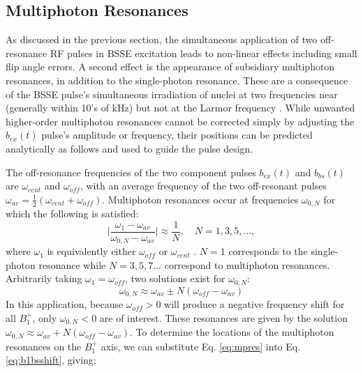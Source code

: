 \documentclass[a4paper,12pt]{article}
\newcommand{\bext}{b_{ex}(t)}
\newcommand{\bbst}{b_{bs}(t)}
\begin{document}
\subsection*{Multiphoton Resonances}
As discussed in the previous section, the simultaneous application of two off-resonance RF pulses in BSSE excitation
leads to non-linear effects including small flip angle errors. 
A second effect is the appearance of subsidiary multiphoton resonances,
in addition to the single-photon resonance. These are a consequence of the BSSE pulse's simultaneous irradiation of nuclei at two frequencies near (generally within 10's of kHz) but not at the Larmor frequency \cite{Zur1983MultiphotonI=1/2}.
While unwanted higher-order multiphoton resonances cannot be corrected simply by adjusting the $\bext$ pulse's
amplitude or frequency, 
their positions can be predicted analytically as follows and used to guide the pulse design. \par The off-resonance frequencies of the two component pulses $\bext$ and $\bbst$ are $\omega_{cent}$ and $ \omega_{off}$, with an average frequency of the two off-resonant pulses $\omega_{av}= \frac{1}{2}(\omega_{cent} + \omega_{off})$.
Multiphoton resonances occur at frequencies $\omega_{0,N}$ 
for which the following is satisfied: 
\begin{equation*}
    \Big|\frac{\omega_1-\omega_{av}}{\omega_{0,N}-\omega_{av}}\Big| \approx \frac{1}{N}, \quad N = 1, 3, 5, \dots,
\end{equation*}
where $\omega_1$ is equivalently either $\omega_{off}$ or $\omega_{cent}$ \cite{Vega1981Multiple-quantumClass}. 
$N=1$ corresponds to the single-photon resonance while $N = 3,5,7\dots$ 
correspond to multiphoton resonances.
Arbitrarily taking $\omega_1 = \omega_{off}$, two solutions exist for $\omega_{0,N}$:
\begin{equation}
    \omega_{0,N} \approx \omega_{av}\pm N(\omega_{off} - \omega_{av}) 
    \label{eq:mpres}
\end{equation}
 In this application, because $\omega_{off} > 0$ will produce a negative frequency shift for all $B_1^+$, only $\omega_{0,N} < 0$ are of interest. These resonances are given by the solution $\omega_{0,N} \approx \omega_{av}+ N(\omega_{off} - \omega_{av})$. 
To determine the locations of the multiphoton resonances on the $B_1^+$ axis,
we can substitute Eq. \ref{eq:mpres} into Eq. \ref{eq:b1bsshift}, giving: 
\end{document}
